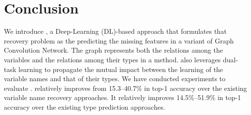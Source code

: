 \section{Conclusion}
\label{sec:conclusion}

We introduce {\tool}, a Deep-Learning (DL)-based approach that
formulates that recovery problem as the predicting the missing
features in a variant of Graph Convolution Network. The graph
represents both the relations among the variables and the relations
among their types in a method. {\tool} also leverages
dual-task learning to propagate the mutual impact between the learning
of the variable names and that of their types. We have conducted
experiments to evaluate {\tool}.
{\tool} relatively improves from 15.3--40.7\% in top-1
accuracy over the existing variable name recovery approaches.
It relatively improves 14.5\%--51.9\% in top-1 accuracy over the
existing type prediction approaches.
